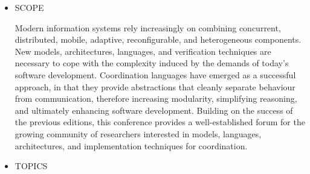 \documentclass[prodmode,acmtecs]{acmsmall} %
\begin{document}
\begin{itemize}\item  SCOPE 
 
  Modern information systems rely increasingly on combining concurrent, distributed, mobile, adaptive, reconfigurable, and heterogeneous components. New models, architectures, languages, and verification techniques are necessary to cope with the complexity induced by the demands of today's software development. Coordination languages have emerged as a successful approach, in that they provide abstractions that cleanly separate behaviour from communication, therefore increasing modularity, simplifying reasoning, and ultimately enhancing software development. Building on the success of the previous editions, this conference provides a well-established forum for the growing community of researchers interested in models, languages, architectures, and implementation techniques for coordination. 
 
\item  TOPICS 
 

\end{itemize}
\end{document}

